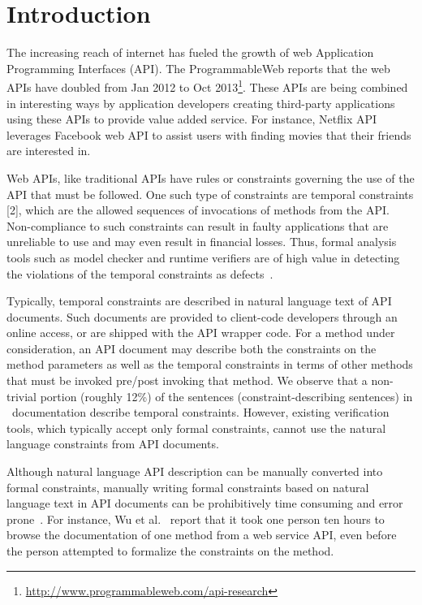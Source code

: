 \section{Introduction}
\label{sec:introduction}



The increasing reach of internet has fueled the growth of web
Application Programming Interfaces (API). The ProgrammableWeb
reports that the web APIs have doubled from Jan 2012 to Oct 2013\footnote{\url{http://www.programmableweb.com/api-research}}.
These APIs are being combined in interesting ways by
application developers creating third-party applications using
these APIs to provide
value added service. For instance, Netflix API leverages Facebook
web API to assist users with finding movies that their friends are
interested in.

Web APIs, like traditional APIs have rules or constraints governing
the use of the API that must be followed. One such type of
constraints are temporal constraints [2], which are the allowed sequences
of invocations of methods from the API. Non-compliance
to such constraints can result in faulty applications that are unreliable
to use and may even result in financial losses. Thus, formal
analysis tools such as model checker and runtime verifiers are of
high value in detecting the violations of the temporal constraints as
defects~\cite{lee2012towards}.


Typically, temporal constraints are described in natural language text of API documents.
Such documents are provided to client-code developers through an online access, or are shipped with the API wrapper code.
For a method under consideration, an API document may describe both the constraints on the method parameters
as well as the temporal constraints in terms of other methods that must be invoked pre/post invoking that method.
We observe that a non-trivial portion (roughly 12\%) of the sentences (constraint-describing sentences)
in \amazonAPI\ documentation describe temporal constraints.
However, existing verification tools, which typically accept only formal constraints,
cannot use the natural language constraints from API documents.

Although natural language API description can be manually converted into formal constraints,
manually writing formal constraints based on natural language text in API documents can be prohibitively time consuming and error prone~\cite{wu2013inferring,RubingerWEB10}. 
For instance, Wu et al.~\cite{wu2013inferring} report that it took one person ten hours to browse the documentation of one method from a web service API, even before the person attempted to formalize the constraints on the method.


